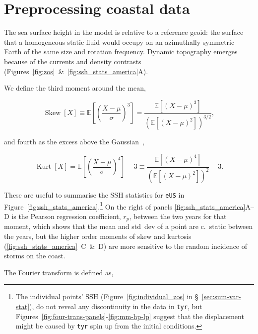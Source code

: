 \section{Preprocessing coastal data}
The sea surface height in the model is relative to
a reference geoid: the surface that a homogeneous static fluid would occupy
on an azimuthally symmetric Earth of the same size and rotation frequency.
Dynamic topography emerges because of the
currents and density contrasts (Figures~\ref{fig:zos}~\&~\ref{fig:ssh_stats_america}A).




We define the third  moment around the mean,

\begin{equation}
\operatorname{Skew}[X]\equiv \mathbb{E}\left[\left(\frac{X-\mu}{\sigma}\right)^{3}\right]
=\frac{\mathbb{E}\left[(X-\mu)^{3}\right]}{\left(\mathbb{E}\left[(X-\mu)^{2}\right]\right)^{3 / 2}},
\end{equation}

and fourth as the excess above the Gaussian~\cite{taleb2019statistical},

\begin{equation}
\operatorname{Kurt}[X]=
\mathbb{E}\left[\left(\frac{X-\mu}{\sigma}\right)^{4}\right]-3
\equiv \frac{\mathbb{E}\left[(X-\mu)^{4}\right]}{\left(\mathbb{E}\left[(X-\mu)^{2}\right]\right)^{2}}-3.
\end{equation}






These are useful to summarise the SSH statistics
for \texttt{eUS} in Figure~\ref{fig:ssh_stats_america}.\footnote{
The individual points' SSH (Figure~\ref{fig:individual_zos} in §~\ref{sec:sum-var-stat}),
do not reveal any discontinuity in the data in \texttt{tyr},
 but Figures~\ref{fig:four-trans-panels}-\ref{fig:mm-hp-lp}
suggest that the displacement might be caused by \texttt{tyr} spin up from the
initial conditions.
}
On the right of panels \ref{fig:ssh_stats_america}A--D
is the Pearson regression coefficient, $r_p$,
between the two years for that moment, which shows that the mean and
std~dev of a point are c.~static between the years,
but the higher order moments of skew and kurtosis
(\ref{fig:ssh_stats_america}~C~\&~D) are more sensitive to the
random incidence of storms on the coast.


\label{sec:fourier}

The Fourier transform is defined as,

